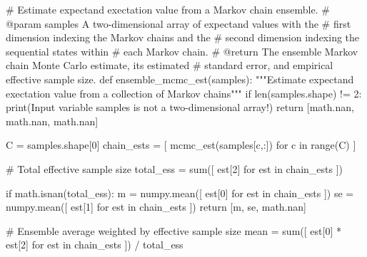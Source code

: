 \documentclass[
  letterpaper,
  DIV=11,
  numbers=noendperiod]{scrartcl}
\newenvironment{Shaded}{\begin{snugshade}}{\end{snugshade}}
\newcommand{\BuiltInTok}[1]{\textcolor[rgb]{0.00,0.23,0.31}{#1}}
\newcommand{\CommentTok}[1]{\textcolor[rgb]{0.37,0.37,0.37}{#1}}
\newcommand{\ControlFlowTok}[1]{\textcolor[rgb]{0.00,0.23,0.31}{#1}}
\newcommand{\DecValTok}[1]{\textcolor[rgb]{0.68,0.00,0.00}{#1}}
\newcommand{\KeywordTok}[1]{\textcolor[rgb]{0.00,0.23,0.31}{#1}}
\newcommand{\NormalTok}[1]{\textcolor[rgb]{0.00,0.23,0.31}{#1}}
\newcommand{\OperatorTok}[1]{\textcolor[rgb]{0.37,0.37,0.37}{#1}}
\newcommand{\StringTok}[1]{\textcolor[rgb]{0.13,0.47,0.30}{#1}}
\begin{document}
\begin{Shaded}
\begin{Highlighting}[]
\CommentTok{\# Estimate expectand exectation value from a Markov chain ensemble.}
\CommentTok{\# @param samples A two{-}dimensional array of expectand values with the }
\CommentTok{\#                first dimension indexing the Markov chains and the }
\CommentTok{\#                second dimension indexing the sequential states within }
\CommentTok{\#                each Markov chain.}
\CommentTok{\# @return The ensemble Markov chain Monte Carlo estimate, its estimated}
\CommentTok{\#         standard error, and empirical effective sample size.}
\KeywordTok{def}\NormalTok{ ensemble\_mcmc\_est(samples):}
  \CommentTok{"""Estimate expectand exectation value from a collection of }
\CommentTok{     Markov chains"""}
  \ControlFlowTok{if} \BuiltInTok{len}\NormalTok{(samples.shape) }\OperatorTok{!=} \DecValTok{2}\NormalTok{:}
    \BuiltInTok{print}\NormalTok{(}\StringTok{\textquotesingle{}Input variable \textasciigrave{}samples\textasciigrave{} is not a two{-}dimensional array!\textquotesingle{}}\NormalTok{)}
    \ControlFlowTok{return}\NormalTok{ [math.nan, math.nan, math.nan]}
    
\NormalTok{  C }\OperatorTok{=}\NormalTok{ samples.shape[}\DecValTok{0}\NormalTok{]}
\NormalTok{  chain\_ests }\OperatorTok{=}\NormalTok{ [ mcmc\_est(samples[c,:]) }\ControlFlowTok{for}\NormalTok{ c }\KeywordTok{in} \BuiltInTok{range}\NormalTok{(C) ]}
  
  \CommentTok{\# Total effective sample size}
\NormalTok{  total\_ess }\OperatorTok{=} \BuiltInTok{sum}\NormalTok{([ est[}\DecValTok{2}\NormalTok{] }\ControlFlowTok{for}\NormalTok{ est }\KeywordTok{in}\NormalTok{ chain\_ests ])}
  
  \ControlFlowTok{if}\NormalTok{ math.isnan(total\_ess):}
\NormalTok{    m  }\OperatorTok{=}\NormalTok{ numpy.mean([ est[}\DecValTok{0}\NormalTok{] }\ControlFlowTok{for}\NormalTok{ est }\KeywordTok{in}\NormalTok{ chain\_ests ])}
\NormalTok{    se }\OperatorTok{=}\NormalTok{ numpy.mean([ est[}\DecValTok{1}\NormalTok{] }\ControlFlowTok{for}\NormalTok{ est }\KeywordTok{in}\NormalTok{ chain\_ests ])}
    \ControlFlowTok{return}\NormalTok{ [m, se, math.nan]}
  
  \CommentTok{\# Ensemble average weighted by effective sample size}
\NormalTok{  mean }\OperatorTok{=} \BuiltInTok{sum}\NormalTok{([ est[}\DecValTok{0}\NormalTok{] }\OperatorTok{*}\NormalTok{ est[}\DecValTok{2}\NormalTok{] }\ControlFlowTok{for}\NormalTok{ est }\KeywordTok{in}\NormalTok{ chain\_ests ]) }\OperatorTok{/}\NormalTok{ total\_ess}
\end{Highlighting}
\end{Shaded}
\end{document}
